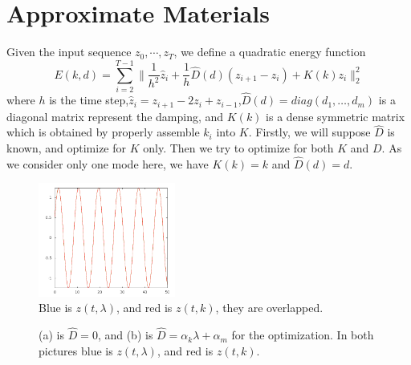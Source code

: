 \documentclass[twocolumn,a4paper]{article}
\begin{document}
\section{Approximate Materials}
Given the input sequence $z_0,\cdots,z_T$, we define a quadratic energy function
\begin{equation} \label{qua-en}
  E(k,d) = \sum_{i=2}^{T-1} \|\frac{1}{h^2}\hat{z}_i+\frac{1}{h}\hat{D}(d)(z_{i+1}-z_{i})+ K(k)z_i\|_2^2
\end{equation}
where $h$ is the time step,$\hat{z}_i=z_{i+1}-2z_{i}+z_{i-1}$,$\hat{D}(d) =
diag(d_1,\dots,d_m)$ is a diagonal matrix represent the damping, and $K(k)$ is a
dense symmetric matrix which is obtained by properly assemble $k_i$ into
$K$. Firstly, we will suppose $\hat{D}$ is known, and optimize for $K$
only. Then we try to optimize for both $K$ and $D$. As we consider only one mode
here, we have $K(k)=k$ and $\hat{D}(d)=d$.

\begin{figure}
  \centering
  \includegraphics[width=0.4\textwidth]{./figures/singleModeNoDamp.png}
  \caption{Blue is $z(t,\lambda)$, and red is $z(t,k)$, they are overlapped.}
  \label{singleModeNoCon}
\end{figure}
\begin{figure}
  \centering
  \caption{(a) is $\hat{D}=0$, and (b) is $\hat{D}=\alpha_k\lambda+\alpha_m$ for
    the optimization. In both pictures blue is $z(t,\lambda)$, and red is
    $z(t,k)$.}
  \label{singleModeD}
\end{figure}
\end{document}
